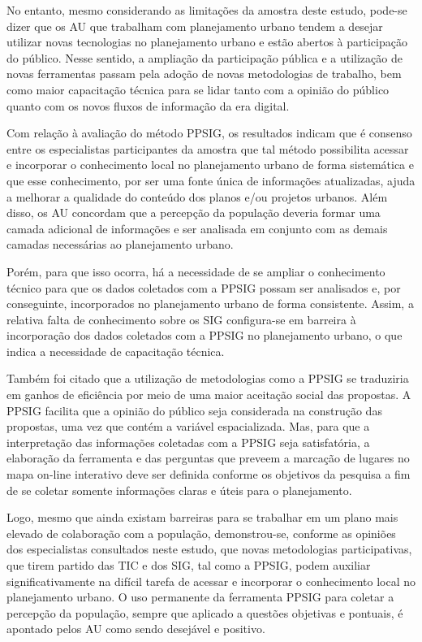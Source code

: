\documentclass{article}
\begin{document}
No entanto, mesmo considerando as limitações da amostra deste estudo, pode-se dizer
				que os AU que trabalham com planejamento urbano tendem a desejar utilizar novas
				tecnologias no planejamento urbano e estão abertos à participação do público. Nesse
				sentido, a ampliação da participação pública e a utilização de novas ferramentas
				passam pela adoção de novas metodologias de trabalho, bem como maior capacitação
				técnica para se lidar tanto com a opinião do público quanto com os novos fluxos de
				informação da era digital.

Com relação à avaliação do método PPSIG, os resultados indicam que é consenso entre
				os especialistas participantes da amostra que tal método possibilita acessar e
				incorporar o conhecimento local no planejamento urbano de forma sistemática e que
				esse conhecimento, por ser uma fonte única de informações atualizadas, ajuda a
				melhorar a qualidade do conteúdo dos planos e/ou projetos urbanos. Além disso, os AU
				concordam que a percepção da população deveria formar uma camada adicional de
				informações e ser analisada em conjunto com as demais camadas necessárias ao
				planejamento urbano.

Porém, para que isso ocorra, há a necessidade de se ampliar o conhecimento técnico
				para que os dados coletados com a PPSIG possam ser analisados e, por conseguinte,
				incorporados no planejamento urbano de forma consistente. Assim, a relativa falta de
				conhecimento sobre os SIG configura-se em barreira à incorporação dos dados
				coletados com a PPSIG no planejamento urbano, o que indica a necessidade de
				capacitação técnica.

Também foi citado que a utilização de metodologias como a PPSIG se traduziria em
				ganhos de eficiência por meio de uma maior aceitação social das propostas. A PPSIG
				facilita que a opinião do público seja considerada na construção das propostas, uma
				vez que contém a variável espacializada. Mas, para que a interpretação das
				informações coletadas com a PPSIG seja satisfatória, a elaboração da ferramenta e
				das perguntas que preveem a marcação de lugares no mapa on-line interativo deve ser
				definida conforme os objetivos da pesquisa a fim de se coletar somente informações
				claras e úteis para o planejamento.

Logo, mesmo que ainda existam barreiras para se trabalhar em um plano mais elevado de
				colaboração com a população, demonstrou-se, conforme as opiniões dos especialistas
				consultados neste estudo, que novas metodologias participativas, que tirem partido
				das TIC e dos SIG, tal como a PPSIG, podem auxiliar significativamente na difícil
				tarefa de acessar e incorporar o conhecimento local no planejamento urbano. O uso
				permanente da ferramenta PPSIG para coletar a percepção da população, sempre que
				aplicado a questões objetivas e pontuais, é apontado pelos AU como sendo desejável e
				positivo.
\end{document}
